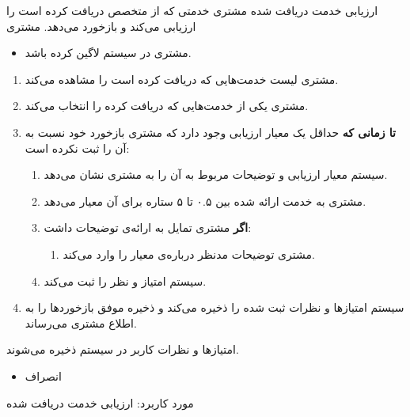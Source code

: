 \usecase
{
	ارزیابی خدمت دریافت شده
}
{}
{
	مشتری خدمتی که از متخصص دریافت کرده است را ارزیابی می‌کند و بازخورد می‌دهد.
}
{
	مشتری
}
{}
{
		\begin{itemize}
		\vspace*{-0.6cm}
		\item 
		مشتری در سیستم لاگین کرده باشد.
	\end{itemize}
}
{
	\vspace*{-0.6cm}
	\begin{enumerate}
		\item 
		مشتری لیست خدمت‌‌هایی که دریافت کرده است را مشاهده می‌کند.
		\item
		مشتری یکی از خدمت‌هایی که دریافت کرده را انتخاب می‌کند.
		\item
		\textbf{تا زمانی که} حداقل یک معیار ارزیابی وجود دارد که مشتری بازخورد خود نسبت به آن را ثبت نکرده است:
		
		\begin{enumerate}[label=\theenumi.\arabic*.]
			\item
سیستم معیار ارزیابی و توضیحات مربوط به آن را به مشتری نشان می‌دهد.
			\item 
مشتری به خدمت ارائه شده بین ۰.۵ تا ۵ ستاره برای آن معیار می‌دهد.
			\item 
			\textbf{اگر} مشتری تمایل به ارائه‌ی توضیحات داشت:
			\begin{enumerate}
				\item 
				مشتری توضیحات مدنظر درباره‌ی معیار را وارد می‌کند. 
			\end{enumerate}
			\item 
			سیستم امتیاز و نظر را ثبت می‌کند.
		\end{enumerate}
		\item
		سیستم امتیازها و نظرات ثبت شده را ذخیره می‌کند و ذخیره موفق بازخوردها را به اطلاع مشتری می‌رساند.
		
	\end{enumerate}
}
{
امتیازها و نظرات کاربر در سیستم ذخیره می‌شوند.
}
{
	\begin{itemize}
		\vspace*{-0.6cm}
		\item 
		انصراف
	\end{itemize}
}
{
	مورد کاربرد: ارزیابی خدمت دریافت شده
}




